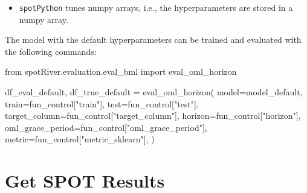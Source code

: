 \documentclass[
  letterpaper,
  DIV=11,
  numbers=noendperiod]{scrreprt}
\newenvironment{Shaded}{\begin{snugshade}}{\end{snugshade}}
\newcommand{\ImportTok}[1]{\textcolor[rgb]{0.00,0.46,0.62}{#1}}
\newcommand{\NormalTok}[1]{\textcolor[rgb]{0.00,0.23,0.31}{#1}}
\newcommand{\OperatorTok}[1]{\textcolor[rgb]{0.37,0.37,0.37}{#1}}
\newcommand{\StringTok}[1]{\textcolor[rgb]{0.13,0.47,0.30}{#1}}
\providecommand{\tightlist}{%
  \setlength{\itemsep}{0pt}\setlength{\parskip}{0pt}}\usepackage{longtable,booktabs,array}
\begin{document}
\begin{tcolorbox}[enhanced jigsaw, left=2mm, toprule=.15mm, colframe=quarto-callout-note-color-frame, leftrule=.75mm, title=\textcolor{quarto-callout-note-color}{\faInfo}\hspace{0.5em}{Note: \texttt{spotPython} tunes numpy arrays}, toptitle=1mm, opacitybacktitle=0.6, arc=.35mm, titlerule=0mm, opacityback=0, bottomtitle=1mm, coltitle=black, rightrule=.15mm, colback=white, colbacktitle=quarto-callout-note-color!10!white, breakable, bottomrule=.15mm]

\begin{itemize}
\tightlist
\item
  \texttt{spotPython} tunes numpy arrays, i.e., the hyperparameters are
  stored in a numpy array.
\end{itemize}

\end{tcolorbox}

The model with the default hyperparameters can be trained and evaluated
with the following commands:

\begin{Shaded}
\begin{Highlighting}[]
\ImportTok{from}\NormalTok{ spotRiver.evaluation.eval\_bml }\ImportTok{import}\NormalTok{ eval\_oml\_horizon}

\NormalTok{df\_eval\_default, df\_true\_default }\OperatorTok{=}\NormalTok{ eval\_oml\_horizon(}
\NormalTok{                    model}\OperatorTok{=}\NormalTok{model\_default,}
\NormalTok{                    train}\OperatorTok{=}\NormalTok{fun\_control[}\StringTok{"train"}\NormalTok{],}
\NormalTok{                    test}\OperatorTok{=}\NormalTok{fun\_control[}\StringTok{"test"}\NormalTok{],}
\NormalTok{                    target\_column}\OperatorTok{=}\NormalTok{fun\_control[}\StringTok{"target\_column"}\NormalTok{],}
\NormalTok{                    horizon}\OperatorTok{=}\NormalTok{fun\_control[}\StringTok{"horizon"}\NormalTok{],}
\NormalTok{                    oml\_grace\_period}\OperatorTok{=}\NormalTok{fun\_control[}\StringTok{"oml\_grace\_period"}\NormalTok{],}
\NormalTok{                    metric}\OperatorTok{=}\NormalTok{fun\_control[}\StringTok{"metric\_sklearn"}\NormalTok{],}
\NormalTok{                )}
\end{Highlighting}
\end{Shaded}

\hypertarget{get-spot-results-7}{%
\section{Get SPOT Results}\label{get-spot-results-7}}
\end{document}
